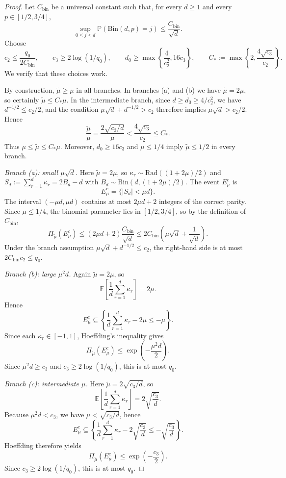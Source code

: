 \documentclass[10pt]{article}
\newcommand{\Pbb}{\mathbb P}
\newcommand{\Ebb}{\mathbb E}
\begin{document}
\begin{proof}
Let $C_{\mathrm{bin}}$ be a universal constant such that, for every
$d\ge 1$ and every $p\in[1/2,3/4]$,
\[
    \sup_{0\le j\le d}\Pbb(\mathrm{Bin}(d,p)=j)\le \frac{C_{\mathrm{bin}}}{\sqrt d}.
\]
Choose
\[
    c_2\le \frac{q_0}{2C_{\mathrm{bin}}},
    \qquad
    c_3\ge 2\log(1/q_0),
    \qquad
    d_0\ge \max\left\{\frac{4}{c_2^2},16c_3\right\},
    \qquad
    C_*:=\max\!\left\{2,\frac{4\sqrt{c_3}}{c_2}\right\}.
\]
We verify that these choices work.

By construction, $\tilde\mu\ge\mu$ in all branches. In branches (a) and (b) we
have $\tilde\mu=2\mu$, so certainly $\tilde\mu\le C_*\mu$. In the intermediate
branch, since $d\ge d_0\ge 4/c_2^2$, we have $d^{-1/2}\le c_2/2$, and the
condition $\mu\sqrt d+d^{-1/2}>c_2$ therefore implies $\mu\sqrt d>c_2/2$.
Hence
\[
    \frac{\tilde\mu}{\mu}
    =
    \frac{2\sqrt{c_3/d}}{\mu}
    <
    \frac{4\sqrt{c_3}}{c_2}
    \le C_*.
\]
Thus $\mu\le\tilde\mu\le C_*\mu$. Moreover,
$d_0\ge16c_3$ and $\mu\le1/4$ imply $\tilde\mu\le1/2$ in every branch.

\medskip\noindent\textit{Branch (a): small $\mu\sqrt d$.}
Here $\tilde\mu=2\mu$, so
$\kappa_r\sim\mathrm{Rad}((1+2\mu)/2)$ and
$S_d:=\sum_{r=1}^d\kappa_r=2B_d-d$ with
$B_d\sim\mathrm{Bin}(d,(1+2\mu)/2)$. The event $E_\mu^c$ is
\[
    E_\mu^c=\{|S_d|<\mu d\}.
\]
The interval $(-\mu d,\mu d)$ contains at most $2\mu d+2$ integers of the
correct parity. Since $\mu\le 1/4$, the binomial parameter lies in
$[1/2,3/4]$, so by the definition of $C_{\mathrm{bin}}$,
\[
    \Pi_{\tilde\mu}(E_\mu^c)
    \le
    (2\mu d+2)\frac{C_{\mathrm{bin}}}{\sqrt d}
    \le
    2C_{\mathrm{bin}}\!\left(\mu\sqrt d+\frac{1}{\sqrt d}\right).
\]
Under the branch assumption
$\mu\sqrt d+d^{-1/2}\le c_2$, the right-hand side is at most
$2C_{\mathrm{bin}}c_2\le q_0$.

\medskip\noindent\textit{Branch (b): large $\mu^2 d$.}
Again $\tilde\mu=2\mu$, so
\[
    \Ebb\!\left[\frac{1}{d}\sum_{r=1}^d\kappa_r\right]=2\mu.
\]
Hence
\[
    E_\mu^c
    \subseteq
    \left\{\frac{1}{d}\sum_{r=1}^d \kappa_r-2\mu\le-\mu\right\}.
\]
Since each $\kappa_r\in[-1,1]$, Hoeffding's inequality gives
\[
    \Pi_{\tilde\mu}(E_\mu^c)
    \le
    \exp\!\left(-\frac{\mu^2 d}{2}\right).
\]
Since $\mu^2 d\ge c_3$ and $c_3\ge 2\log(1/q_0)$, this is at most $q_0$.

\medskip\noindent\textit{Branch (c): intermediate $\mu$.}
Here $\tilde\mu=2\sqrt{c_3/d}$, so
\[
    \Ebb\!\left[\frac{1}{d}\sum_{r=1}^d\kappa_r\right]
    =
    2\sqrt{\frac{c_3}{d}}.
\]
Because $\mu^2 d<c_3$, we have $\mu<\sqrt{c_3/d}$, hence
\[
    E_\mu^c
    \subseteq
    \left\{\frac{1}{d}\sum_{r=1}^d \kappa_r-2\sqrt{\frac{c_3}{d}}
    \le
    -\sqrt{\frac{c_3}{d}}\right\}.
\]
Hoeffding therefore yields
\[
    \Pi_{\tilde\mu}(E_\mu^c)
    \le
    \exp\!\left(-\frac{c_3}{2}\right).
\]
Since $c_3\ge 2\log(1/q_0)$, this is at most $q_0$.
\end{proof}
\end{document}
